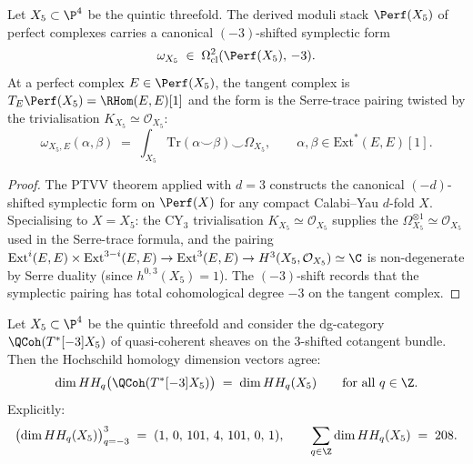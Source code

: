 \begin{theorem}
\label{thm:ptvv-quintic}
Let $X_5\subset \P^4$ be the quintic threefold. The derived moduli stack
$\Perf(X_5)$ of perfect complexes carries a canonical $(-3)$-shifted
symplectic form
\[
\omega_{X_5} \;\in\; \Omega^2_{\mathrm{cl}}(\Perf(X_5),\, -3).
\]
At a perfect complex $E\in\Perf(X_5)$, the tangent complex is
$T_E\Perf(X_5) = \RHom(E, E)[1]$ and the form is the Serre-trace pairing
twisted by the trivialisation $K_{X_5}\simeq \mathcal{O}_{X_5}$:
\[
\omega_{X_5,E}(\alpha,\beta) \;=\; \int_{X_5}
\mathrm{Tr}(\alpha\smile\beta)\smile \Omega_{X_5},
\qquad
\alpha,\beta\in \mathrm{Ext}^*(E,E)[1].
\]
\end{theorem}

\begin{proof}
The PTVV theorem \cite[Thm.~2.5]{PTVV2013} applied with $d=3$
constructs the canonical $(-d)$-shifted symplectic form on $\Perf(X)$
for any compact Calabi--Yau $d$-fold $X$. Specialising to $X = X_5$:
the CY$_3$ trivialisation $K_{X_5}\simeq \mathcal{O}_{X_5}$ supplies
the $\Omega_{X_5}^{\otimes 1}\simeq \mathcal{O}_{X_5}$ used in the
Serre-trace formula, and the pairing
$\mathrm{Ext}^i(E,E)\times \mathrm{Ext}^{3-i}(E,E)\to
\mathrm{Ext}^3(E,E)\to H^3(X_5,\mathcal{O}_{X_5})\simeq \C$
is non-degenerate by Serre duality (since $h^{0,3}(X_5)=1$). The
$(-3)$-shift records that the symplectic pairing has total cohomological
degree $-3$ on the tangent complex.
\end{proof}

\begin{theorem}
\label{thm:hkr-matching-predictor-quintic}
Let $X_5\subset \P^4$ be the quintic threefold and consider the dg-category
$\QCoh(T^*[-3]X_5)$ of quasi-coherent sheaves on the $3$-shifted cotangent
bundle. Then the Hochschild homology dimension vectors agree:
\[
\dim HH_q\bigl(\QCoh(T^*[-3]X_5)\bigr) \;=\; \dim HH_q(X_5)
\qquad \text{for all } q\in \Z.
\]
Explicitly:
\[
\bigl(\dim HH_q(X_5)\bigr)_{q=-3}^{3} \;=\; (1,\,0,\,101,\,4,\,101,\,0,\,1),
\qquad
\sum_{q\in\Z} \dim HH_q(X_5) \;=\; 208.
\]
\end{theorem}

